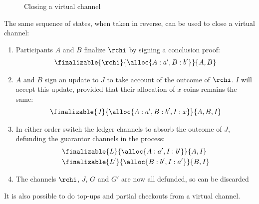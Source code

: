 \begin{figure}[ht]\centering
  \makebox[\textwidth][c]{}
  \caption{Closing a virtual channel}
  \label{fig:virtual-channel-closing}
\end{figure}

The same sequence of states, when taken in reverse, can be used to close a virtual channel:
\begin{enumerate}
  \item Participants $A$ and $B$ finalize $\rchi$ by signing a conclusion proof:
  \begin{align}
    \finalizable{\rchi}{\alloc{A:a', B:b'}}{A,B}
  \end{align}
  \item $A$ and $B$ sign an update to $J$ to take account of the outcome of $\rchi$. $I$ will accept this update, provided that their allocation of $x$ coins remains the same:
  \begin{align}
    \finalizable{J}{\alloc{A: a', B:b', I: x}}{A, B, I}
  \end{align}
  \item In either order switch the ledger channels to absorb the outcome of $J$, defunding the guarantor channels in the process:
  \begin{align}
    & \finalizable{L}{\alloc{A: a', I: b'}}{A,I} \\
    & \finalizable{L'}{\alloc{B: b', I: a'}}{B,I}
  \end{align}
  \item The channels $\rchi$, $J$, $G$ and $G'$ are now all defunded, so can be discarded
\end{enumerate}

It is also possible to do top-ups and partial checkouts from a virtual channel.
